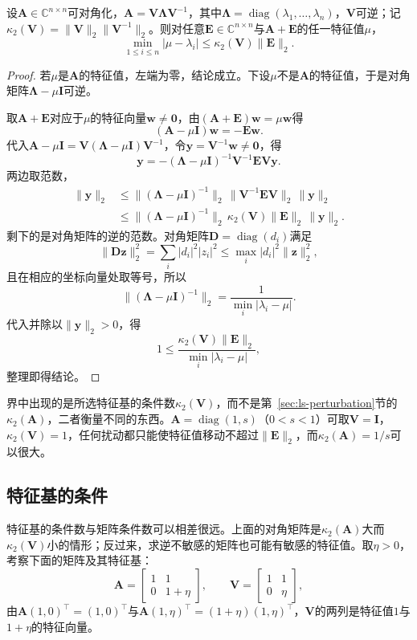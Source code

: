 \begin{theorem}
\label{thm:ls-bauer-fike}
设$\bm A\in\mathbb C^{n\times n}$可对角化，$\bm A=\bm V\bm\Lambda\bm V^{-1}$，其中$\bm\Lambda=\operatorname{diag}(\lambda_1,\ldots,\lambda_n)$，$\bm V$可逆；记$\kappa_2(\bm V)=\lVert\bm V\rVert_2\lVert\bm V^{-1}\rVert_2$。则对任意$\bm E\in\mathbb C^{n\times n}$与$\bm A+\bm E$的任一特征值$\mu$，
\begin{equation}
 \min_{1\leq i\leq n}|\mu-\lambda_i|\leq\kappa_2(\bm V)\lVert\bm E\rVert_2 .
 \label{eq:ls-bauer-fike}
\end{equation}
\end{theorem}
\begin{proof}
若$\mu$是$\bm A$的特征值，左端为零，结论成立。下设$\mu$不是$\bm A$的特征值，于是对角矩阵$\bm\Lambda-\mu\bm I$可逆。

取$\bm A+\bm E$对应于$\mu$的特征向量$\bm w\neq\bm0$，由$(\bm A+\bm E)\bm w=\mu\bm w$得
\[
 (\bm A-\mu\bm I)\bm w=-\bm E\bm w .
\]
代入$\bm A-\mu\bm I=\bm V(\bm\Lambda-\mu\bm I)\bm V^{-1}$，令$\bm y=\bm V^{-1}\bm w\neq\bm0$，得
\[
 \bm y=-(\bm\Lambda-\mu\bm I)^{-1}\bm V^{-1}\bm E\bm V\bm y .
\]
两边取范数，
\[
 \begin{aligned}
 \lVert\bm y\rVert_2
 &\leq\lVert(\bm\Lambda-\mu\bm I)^{-1}\rVert_2\,\lVert\bm V^{-1}\bm E\bm V\rVert_2\,\lVert\bm y\rVert_2\\
 &\leq\lVert(\bm\Lambda-\mu\bm I)^{-1}\rVert_2\,\kappa_2(\bm V)\lVert\bm E\rVert_2\,\lVert\bm y\rVert_2 .
 \end{aligned}
\]
剩下的是对角矩阵的逆的范数。对角矩阵$\bm D=\operatorname{diag}(d_i)$满足
\[
 \lVert\bm D\bm z\rVert_2^2=\sum_i|d_i|^2|z_i|^2\leq\max_i|d_i|^2\lVert\bm z\rVert_2^2 ,
\]
且在相应的坐标向量处取等号，所以
\[
 \lVert(\bm\Lambda-\mu\bm I)^{-1}\rVert_2=\frac1{\min_i|\lambda_i-\mu|}.
\]
代入并除以$\lVert\bm y\rVert_2>0$，得
\[
 1\leq\frac{\kappa_2(\bm V)\lVert\bm E\rVert_2}{\min_i|\lambda_i-\mu|},
\]
整理即得结论。
\end{proof}
界中出现的是所选特征基的条件数$\kappa_2(\bm V)$，而不是第~\ref{sec:ls-perturbation}节的$\kappa_2(\bm A)$，二者衡量不同的东西。$\bm A=\operatorname{diag}(1,s)$（$0<s<1$）可取$\bm V=\bm I$，$\kappa_2(\bm V)=1$，任何扰动都只能使特征值移动不超过$\lVert\bm E\rVert_2$，而$\kappa_2(\bm A)=1/s$可以很大。

\subsection{特征基的条件}
特征基的条件数与矩阵条件数可以相差很远。上面的对角矩阵是$\kappa_2(\bm A)$大而$\kappa_2(\bm V)$小的情形；反过来，求逆不敏感的矩阵也可能有敏感的特征值。取$\eta>0$，考察下面的矩阵及其特征基：
\[
 \bm A=\begin{bmatrix}1&1\\0&1+\eta\end{bmatrix},\qquad
 \bm V=\begin{bmatrix}1&1\\0&\eta\end{bmatrix},
\]
由$\bm A(1,0)^\top=(1,0)^\top$与$\bm A(1,\eta)^\top=(1+\eta)(1,\eta)^\top$，$\bm V$的两列是特征值$1$与$1+\eta$的特征向量。

